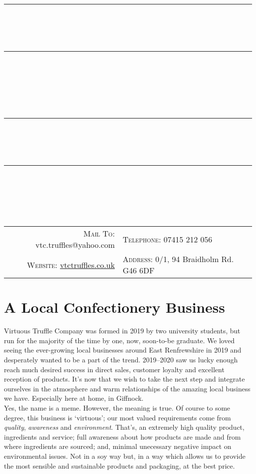 \documentclass[11pt, english]{article}
\newcommand{\HRule}[1]{\rule{\linewidth}{#1}}
\begin{document}

	\title{
		\HRule{0.5pt}\\ [-0.7cm]
		\HRule{0.5pt}\\ [-0.125cm]
		\Huge{}\\
		\Large{}
		\HRule{0.5pt}\\ [-0.7cm]
		\HRule{0.5pt}\\ [-1.5cm]
		}
        \author{\textit{}}
        \date{}
        \maketitle

\begin{center}
	\scriptsize
\begin{tabular}{r|l}
	\textsc{Mail To:} vtc.truffles@yahoo.com & \textsc{Telephone:} 07415 212 056\\
	\textsc{Website:} \href{http://vtctruffles.co.uk}{vtctruffles.co.uk} & \textsc{Address:} 0/1, 94 Braidholm Rd. G46 6DF\\
\end{tabular}
\end{center}

\section{A Local Confectionery Business}

\footnotesize Virtuous Truffle Company was formed in 2019 by two university students, but run for the majority of the time by one, now, soon-to-be graduate. We loved seeing the ever-growing local businesses around East Renfrewshire in 2019 and desperately wanted to be a part of the trend. 2019--2020 saw us lucky enough reach much desired success in direct sales, customer loyalty and excellent reception of products. It's now that we wish to take the next step and integrate ourselves in the atmosphere and warm relationships of the amazing local business we have. Especially here at home, in Giffnock.\\

Yes, the name is a meme. However, the meaning is true. Of course to some degree, this business is `virtuous'; our most valued requirements come from \textit{quality}, \textit{awareness} and \textit{environment}. That's, an extremely high quality product, ingredients and service; full awareness about how products are made and from where ingredients are sourced; and, minimal unecessary negative impact on environmental issues. Not in a soy way but, in a way which allows us to provide the most sensible and sustainable products and packaging, at the best price.
\end{document}
